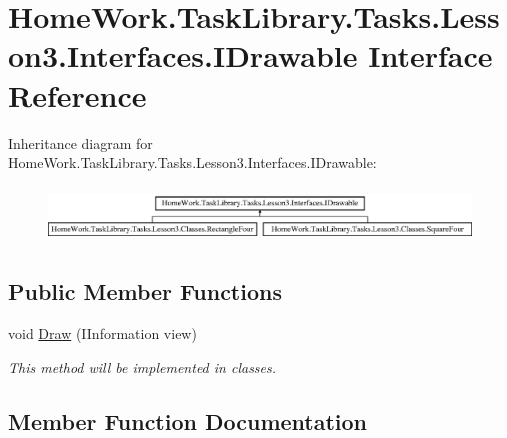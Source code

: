 \hypertarget{interface_home_work_1_1_task_library_1_1_tasks_1_1_lesson3_1_1_interfaces_1_1_i_drawable}{}\section{Home\+Work.\+Task\+Library.\+Tasks.\+Lesson3.\+Interfaces.\+I\+Drawable Interface Reference}
\label{interface_home_work_1_1_task_library_1_1_tasks_1_1_lesson3_1_1_interfaces_1_1_i_drawable}
Inheritance diagram for Home\+Work.\+Task\+Library.\+Tasks.\+Lesson3.\+Interfaces.\+I\+Drawable\+:\begin{figure}[H]
\begin{center}
\leavevmode
\includegraphics[height=1.497326cm]{interface_home_work_1_1_task_library_1_1_tasks_1_1_lesson3_1_1_interfaces_1_1_i_drawable}
\end{center}
\end{figure}
\subsection*{Public Member Functions}
\begin{DoxyCompactItemize}
\item 
void \mbox{\hyperlink{interface_home_work_1_1_task_library_1_1_tasks_1_1_lesson3_1_1_interfaces_1_1_i_drawable_aa4df9dc24fb7a0eb689e4a8b0dc80b09}{Draw}} (I\+Information view)
\begin{DoxyCompactList}\small\item\em This method will be implemented in classes. \end{DoxyCompactList}\end{DoxyCompactItemize}


\subsection{Member Function Documentation}
\mbox{\label{interface_home_work_1_1_task_library_1_1_tasks_1_1_lesson3_1_1_interfaces_1_1_i_drawable_aa4df9dc24fb7a0eb689e4a8b0dc80b09}} 
